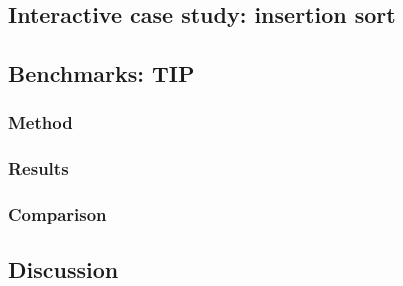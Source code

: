\label{sec:evaluation}

\subsection{Interactive case study: insertion sort}

\subsection{Benchmarks: TIP}

\subsubsection{Method}

\subsubsection{Results}

\subsubsection{Comparison}

\subsection{Discussion}   %
